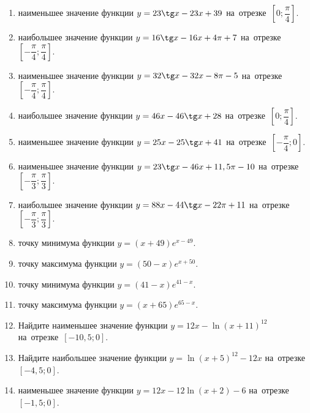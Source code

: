 \documentclass[a4paper,10pt]{article}
\begin{document}
\begin{enumerate}
\item {} наименьшее значение функции $y = 23\tg x-23x+39$ на~отрезке~$\left[0;\dfrac{\pi }{4}\right]$.

\item {} наибольшее значение функции $y=16\tg x-16x+4\pi +7$ на~отрезке~$\left[-\dfrac{\pi }{4};\dfrac{\pi }{4}\right]$.

\item {} наименьшее значение функции $y=32\tg x-32x-8\pi -5$ на~отрезке~$\left[-\dfrac{\pi }{4};\dfrac{\pi }{4}\right]$.

\item {} наибольшее значение функции $y = 46x-46\tg x +28$ на~отрезке~$\left[0;\dfrac{\pi }{4}\right]$.

\item {} наименьшее значение функции $y = 25x-25\tg x +41$ на~отрезке~$\left[-\dfrac{\pi }{4};0\right]$.

\item {} наименьшее значение функции $y = 23\tg x-46x+11,5 \pi -10$ на~отрезке~$\left[-\dfrac{\pi }{3};\dfrac{\pi }{3}\right]$.

\item {} наибольшее значение функции $y = 88x-44\tg x-22\pi +11$ на~отрезке~$\left[-\dfrac{\pi }{3};\dfrac{\pi }{3}\right]$.

\item {} точку минимума функции $y = \left(x+49\right)e^{x-49}$.

\item {} точку максимума функции $y = \left(50-x\right)e^{x+50}$.

\item {} точку минимума функции $y = \left(41-x\right)e^{41-x}$.

\item {} точку максимума функции $y = \left(x+65\right)e^{65-x}$.

\item Найдите наименьшее значение функции $y = 12x-\ln \left(x+11\right)^{12}$ на~отрезке~$\left[-10,5;0\right]$.

\item Найдите наибольшее значение функции $y = \ln \left(x+5\right)^{12}-12x$ на~отрезке~$\left[-4,5;0\right]$.

\item {} наименьшее значение функции $y = 12x-12\ln \left(x+2\right) -6$ на~отрезке~$\left[-1,5;0\right]$.


\end{enumerate}
\end{document}
